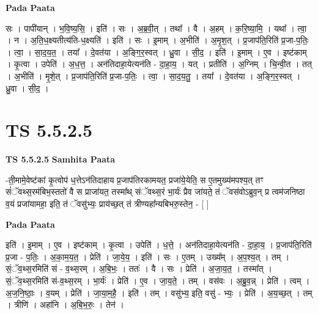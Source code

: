 \documentclass[17pt]{extarticle}
\begin{document}
\textbf{Pada Paata} \newline

सः । पापी॑यान् । भ॒वि॒ष्य॒सि॒ । इति॑ । सः । अ॒ब्र॒वी॒त् । तथा᳚ । वै । अ॒हम् । क॒रि॒ष्या॒मि॒ । यथा᳚ । त्वा॒ । न । अ॒ति॒ध॒क्ष्यतीत्य॑ति-ध॒क्ष्यति॑ । इति॑ । सः । इ॒माम् । अ॒भीति॑ । अ॒मृ॒श॒त् । प्र॒जाप॑ति॒रिति॑ प्र॒जा-प॒तिः॒ । त्वा॒ । सा॒द॒य॒त॒ । तया᳚ । दे॒वत॑या । अ॒ङ्गि॒र॒स्वत् । ध्रु॒वा । सी॒द॒ । इति॑ । इ॒माम् । ए॒व । इष्ट॑काम् । कृ॒त्वा । उपेति॑ । अ॒ध॒त्त॒ । अन॑तिदाहा॒येत्यन॑ति - दा॒हा॒य॒ । यत् । प्रतीति॑ । अ॒ग्निम् । चि॒न्वी॒त । तत् । अ॒भीति॑ । मृ॒शे॒त् । प्र॒जाप॑ति॒रिति॑ प्र॒जा-प॒तिः॒ । त्वा॒ । सा॒द॒य॒तु॒ । तया᳚ । दे॒वत॑या । अ॒ङ्गि॒र॒स्वत् । ध्रु॒वा । सी॒द॒ ।  \newline




\section*{ TS 5.5.2.5 }

\textbf{TS 5.5.2.5 } \newline
\textbf{Samhita Paata} \newline

-ती॒मामे॒वेष्ट॑कां कृ॒त्वोप॑ ध॒त्तेऽन॑तिदाहाय प्र॒जाप॑तिरकामयत॒ प्रजा॑ये॒येति॒ स ए॒तमुख्य॑मपश्य॒त् तꣳ सं॑ॅवथ्स॒रम॑बिभ॒स्ततो॑ वै स प्राजा॑यत॒ तस्मा᳚थ् संॅवथ्स॒रं भा॒र्यः॑ प्रैव जा॑यते॒ तं ॅवस॑वोऽब्रुव॒न् प्र त्वम॑जनिष्ठा व॒यं प्रजा॑यामहा॒ इति॒ तं ॅवसु॑भ्यः॒ प्राय॑च्छ॒त् तं त्रीण्यहा᳚न्यबिभरु॒स्तेन॒ - [  ] \newline

\textbf{Pada Paata} \newline

इति॑ । इ॒माम् । ए॒व । इष्ट॑काम् । कृ॒त्वा । उपेति॑ । ध॒त्ते॒ । अन॑तिदाहा॒येत्यन॑ति - दा॒हा॒य॒ । प्र॒जाप॑ति॒रिति॑ प्र॒जा - प॒तिः॒ । अ॒का॒म॒य॒त॒ । प्रेति॑ । जा॒ये॒य॒ । इति॑ । सः । ए॒तम् । उख्य᳚म् । अ॒प॒श्य॒त् । तम् । सं॒ॅव॒थ्स॒रमिति॑ सं - व॒थ्स॒रम् । अ॒बि॒भः॒ । ततः॑ । वै । सः । प्रेति॑ । अ॒जा॒य॒त॒ । तस्मा᳚त् । सं॒ॅव॒थ्स॒रमिति॑ सं-व॒थ्स॒रम् । भा॒र्यः॑ । प्रेति॑ । ए॒व । जा॒य॒ते॒ । तम् । वस॑वः । अ॒ब्रु॒व॒न्न् । प्रेति॑ । त्वम् । अ॒ज॒नि॒ष्ठाः॒ । व॒यम् । प्रेति॑ । जा॒या॒म॒है॒ । इति॑ । तम् । वसु॑भ्य॒ इति॒ वसु॑ - भ्यः॒ । प्रेति॑ । अ॒य॒च्छ॒त् । तम् । त्रीणि॑ । अहा॑नि । अ॒बि॒भ॒रुः॒ । तेन॑ ।  \newline




\end{document}
